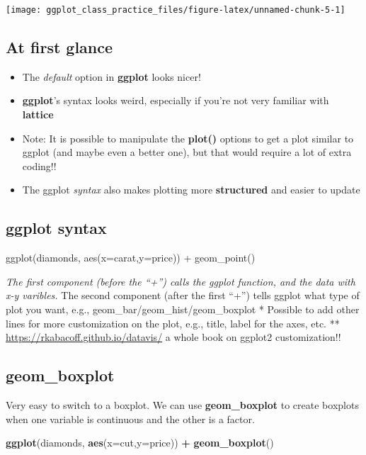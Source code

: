 \documentclass[
]{article}
\newenvironment{Shaded}{\begin{snugshade}}{\end{snugshade}}
\newcommand{\AttributeTok}[1]{\textcolor[rgb]{0.13,0.29,0.53}{#1}}
\newcommand{\FunctionTok}[1]{\textcolor[rgb]{0.13,0.29,0.53}{\textbf{#1}}}
\newcommand{\NormalTok}[1]{#1}
\newcommand{\SpecialCharTok}[1]{\textcolor[rgb]{0.81,0.36,0.00}{\textbf{#1}}}
\providecommand{\tightlist}{%
  \setlength{\itemsep}{0pt}\setlength{\parskip}{0pt}}
\begin{document}
\begin{center}\texttt{[image: ggplot\_class\_practice\_files/figure-latex/unnamed-chunk-5-1]} \end{center}

\hypertarget{at-first-glance}{%
\subsection{At first glance}\label{at-first-glance}}

\begin{itemize}
\tightlist
\item
  The \emph{default} option in \textbf{ggplot} looks nicer!
\item
  \textbf{ggplot}'s syntax looks weird, especially if you're not very
  familiar with \textbf{lattice}
\item
  Note: It is possible to manipulate the \textbf{plot()} options to get
  a plot similar to ggplot (and maybe even a better one), but that would
  require a lot of extra coding!!
\item
  The ggplot \emph{syntax} also makes plotting more \textbf{structured}
  and easier to update
\end{itemize}

\hypertarget{ggplot-syntax}{%
\subsection{ggplot syntax}\label{ggplot-syntax}}

ggplot(diamonds, aes(x=carat,y=price)) + geom\_point()

\emph{The first component (before the ``+'') calls the ggplot function,
and the data with x-y varibles. } The second component (after the first
``+'') tells ggplot what type of plot you want, e.g.,
geom\_bar/geom\_hist/geom\_boxplot * Possible to add other lines for
more customization on the plot, e.g., title, label for the axes, etc. **
\url{https://rkabacoff.github.io/datavis/} a whole book on ggplot2
customization!!

\hypertarget{geom_boxplot}{%
\subsection{geom\_boxplot}\label{geom_boxplot}}

Very easy to switch to a boxplot. We can use \textbf{geom\_boxplot} to
create boxplots when one variable is continuous and the other is a
factor.

\begin{Shaded}
\begin{Highlighting}[]
\FunctionTok{ggplot}\NormalTok{(diamonds, }\FunctionTok{aes}\NormalTok{(}\AttributeTok{x=}\NormalTok{cut,}\AttributeTok{y=}\NormalTok{price)) }\SpecialCharTok{+} \FunctionTok{geom\_boxplot}\NormalTok{()}
\end{Highlighting}
\end{Shaded}
\end{document}
